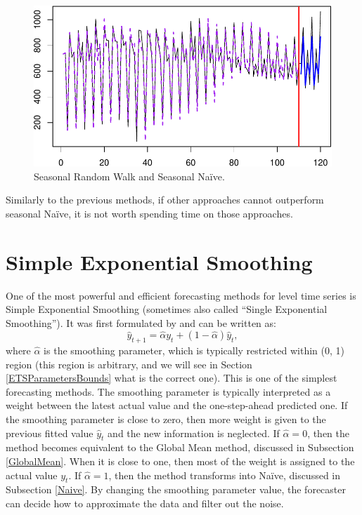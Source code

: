 \documentclass[
]{book}
\theoremstyle{definition}
\theoremstyle{definition}
\theoremstyle{definition}
\theoremstyle{definition}
\theoremstyle{remark}
\begin{document}
\begin{figure}
\centering
\includegraphics{Svetunkov--2022----ADAM_files/figure-latex/NaiveSeasonalExample-1.pdf}
\caption{\label{fig:NaiveSeasonalExample}Seasonal Random Walk and Seasonal Naïve.}
\end{figure}

Similarly to the previous methods, if other approaches cannot outperform seasonal Naïve, it is not worth spending time on those approaches.

\hypertarget{SES}{%
\section{Simple Exponential Smoothing}\label{SES}}

One of the most powerful and efficient forecasting methods for level time series \citep[which is also very popular in practice according to][]{LCFweller2012} is Simple Exponential Smoothing (sometimes also called ``Single Exponential Smoothing''). It was first formulated by \citet{Brown1956} and can be written as:
\begin{equation}
  \hat{y}_{t+1} = \hat{\alpha} {y}_{t} + (1 -\hat{\alpha}) \hat{y}_{t},
  \label{eq:BrownMethod}
\end{equation}
where \(\hat{\alpha}\) is the smoothing parameter, which is typically restricted within (0, 1) region (this region is arbitrary, and we will see in Section \ref{ETSParametersBounds} what is the correct one). This is one of the simplest forecasting methods. The smoothing parameter is typically interpreted as a weight between the latest actual value and the one-step-ahead predicted one. If the smoothing parameter is close to zero, then more weight is given to the previous fitted value \(\hat{y}_{t}\) and the new information is neglected. If \(\hat{\alpha}=0\), then the method becomes equivalent to the Global Mean method, discussed in Subsection \ref{GlobalMean}. When it is close to one, then most of the weight is assigned to the actual value \({y}_{t}\). If \(\hat{\alpha}=1\), then the method transforms into Naïve, discussed in Subsection \ref{Naive}. By changing the smoothing parameter value, the forecaster can decide how to approximate the data and filter out the noise.
\end{document}
